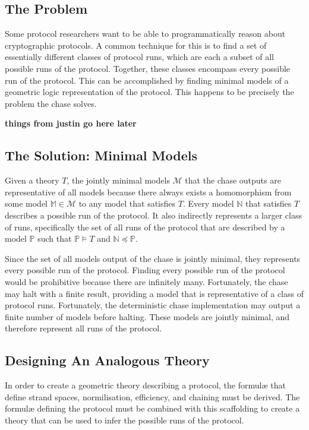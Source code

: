 	\subsection{The Problem}

		Some protocol researchers want to be able to programmatically reason
		about cryptographic protocols. A common technique for this is to find a
		set of essentially different classes of protocol runs, which are each a
		subset of all possible runs of the protocol. Together, these classes
		encompass every possible run of the protocol. This can be accomplished
		by finding minimal models of a geometric logic representation of the
		protocol. This happens to be precisely the problem the chase solves.

		\textbf{ things from justin go here later }

	\subsection{The Solution: Minimal Models}

		Given a theory $T$, the jointly minimal models $\mathcal{M}$ that the
		chase outputs are representative of all models because there always
		exists a homomorphism from some model $\mathbb{M} \in \mathcal{M}$ to
		any model that satisfies $T$. Every model $\mathbb{N}$ that satisfies
		$T$ describes a possible run of the protocol. It also indirectly
		represents a larger class of runs, specifically the set of all runs of
		the protocol that are described by a model $\mathbb{P}$ such that
		$\mathbb{P} \models T$ and $\mathbb{N} \preceq \mathbb{P}$.

		Since the set of all models output of the chase is jointly minimal,
		they represents every possible run of the protocol. Finding every
		possible run of the protocol would be prohibitive because there are
		infinitely many. Fortunately, the chase may halt with a finite result,
		providing a model that is representative of a class of protocol runs.
		Fortunately, the deterministic chase implementation may output a finite
		number of models before halting. These models are jointly minimal, and
		therefore represent all runs of the protocol.

	\subsection{Designing An Analogous Theory}

		In order to create a geometric theory describing a protocol, the
		formul{\ae} that define strand spaces, normilisation, efficiency, and
		chaining must be derived. The formul{\ae} defining the protocol must be
		combined with this scaffolding to create a theory that can be used to
		infer the possible runs of the protocol.

